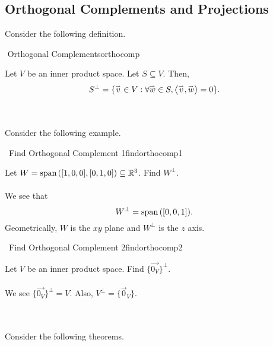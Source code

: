     \subsection{Orthogonal Complements and Projections}

        Consider the following definition.
        \begin{definition}{\Stop\,\,Orthogonal Complements}{orthocomp}

            Let \(V\) be an inner product space. Let \(S\subseteq V\). Then,
            \begin{equation*}
                S^{\perp}=\{\overset{_{\rightharpoonup}}{v}\in V:\forall \overset{_{\rightharpoonup}}{w}\in S, \left\langle \overset{_{\rightharpoonup}}{v},\overset{_{\rightharpoonup}}{w}\right\rangle=0\}.
            \end{equation*}

        \end{definition}
        \vphantom
        \\
        \\
        Consider the following example.
        \begin{example}{\Difficulty\,\Difficulty\,\,Find Orthogonal Complement 1}{findorthocomp1}

            Let \(W=\text{span\,}([1,0,0],[0,1,0])\subseteq\mathbb{R}^3\). Find \(W^\perp\).
            \\
            \\
            We see that 
            \begin{equation*}
                W^\perp=\text{span\,}([0,0,1]).
            \end{equation*}
            Geometrically, \(W\) is the \(xy\) plane and \(W^\perp\) is the \(z\) axis.
            
        \end{example}
        \begin{example}{\Difficulty\,\Difficulty\,\,Find Orthogonal Complement 2}{findorthocomp2}

           Let \(V\) be an inner product space. Find \(\{\vec{0_V}\}^\perp\).
           \\
           \\
           We see \(\{\vec{0_V}\}^\perp=V\). Also, \(V^\perp=\{\vec{0}_V\}\).
        
        \end{example}
        \pagebreak
        \vphantom
        \\
        \\
        Consider the following theorems.
